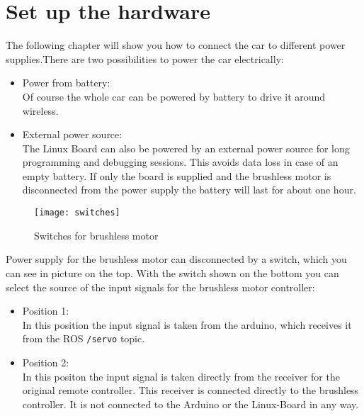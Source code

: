%
%

\newcommand{\makro}[1]{\texttt{\textbackslash{}#1\{\}}}

\chapter{Set up the hardware}
\label{sec:setup}

The following chapter will show you how to connect the car to different power supplies.There are two possibilities to power the car electrically:

\begin{itemize}
		\item Power from battery:\\
					Of course the whole car can be powered by battery to drive it around wireless.
		\item External power source: \\
					The Linux Board can also be powered by an external power source for long programming and debugging sessions. This avoids data loss in case of an empty battery. If only the board is supplied and the brushless motor is disconnected from the power supply the battery will last for about one hour.					
\end{itemize}



\begin{wrapfigure}[15]{l}{0.35\textwidth}
  \begin{center}
    \texttt{[image: switches]}
		\caption{Switches for brushless motor}
		\label{fig:switches}
  \end{center}	
\end{wrapfigure} 

Power supply for the brushless motor can disconnected by a switch, which you can see in picture  on the top. With the switch shown on the bottom you can select the source of the input signals for the brushless motor controller:

\begin{itemize}
\item Position 1:\\
In this position the input signal is taken from the arduino, which receives it from the ROS \texttt{/servo} topic.
\item Position 2:\\
In this positon the input signal is taken directly from the receiver for the original remote controller. This receiver is connected directly to the brushless controller. It is not connected to the Arduino or the Linux-Board in any way.
\end{itemize}



